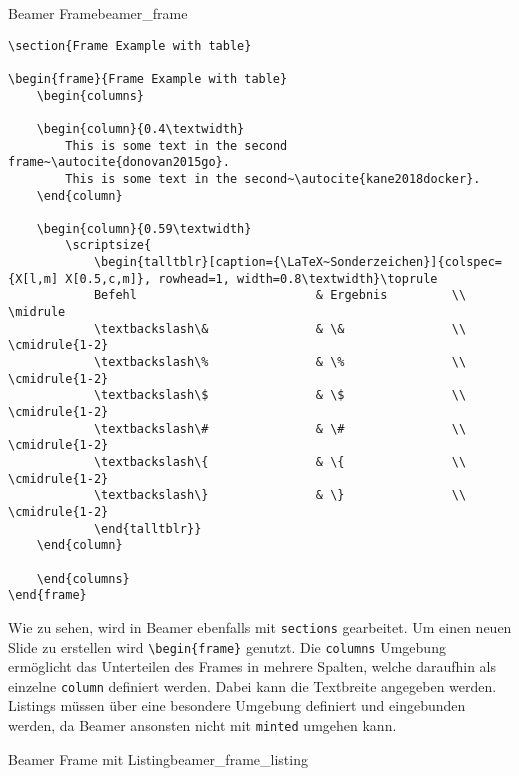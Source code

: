 \begin{code}{Beamer Frame}{beamer_frame}
	\begin{verbatim}
\section{Frame Example with table}

\begin{frame}{Frame Example with table}
	\begin{columns}

	\begin{column}{0.4\textwidth}
		This is some text in the second frame~\autocite{donovan2015go}.
		This is some text in the second~\autocite{kane2018docker}. 
	\end{column}

	\begin{column}{0.59\textwidth}
		\scriptsize{
			\begin{talltblr}[caption={\LaTeX~Sonderzeichen}]{colspec={X[l,m] X[0.5,c,m]}, rowhead=1, width=0.8\textwidth}\toprule
			Befehl                         & Ergebnis         \\ \midrule
			\textbackslash\&               & \&               \\ \cmidrule{1-2}
			\textbackslash\%               & \%               \\ \cmidrule{1-2}
			\textbackslash\$               & \$               \\ \cmidrule{1-2}
			\textbackslash\#               & \#               \\ \cmidrule{1-2}
			\textbackslash\{               & \{               \\ \cmidrule{1-2}
			\textbackslash\}               & \}               \\ \cmidrule{1-2}
			\end{talltblr}}
	\end{column}

	\end{columns} 
\end{frame}                       
	\end{verbatim}
\end{code}

Wie zu sehen, wird in Beamer ebenfalls mit \texttt{sections} gearbeitet. Um einen neuen Slide zu erstellen wird 
\texttt{\textbackslash begin\{frame\}} genutzt. Die \texttt{columns} Umgebung ermöglicht das Unterteilen des Frames 
in mehrere Spalten, welche daraufhin als einzelne \texttt{column} definiert werden. Dabei kann die Textbreite angegeben werden.\\
Listings müssen über eine besondere Umgebung definiert und eingebunden werden, da Beamer ansonsten nicht mit \texttt{minted} umgehen kann. 

\begin{code}{Beamer Frame mit Listing}{beamer_frame_listing}
		\inputminted{latex}{src/beamerlisting.txt}
\end{code}
